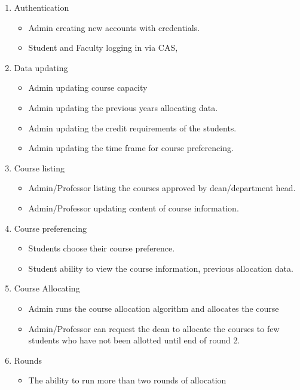 \documentclass[conference]{IEEEtran}
\begin{document}
\begin{enumerate}
    \item Authentication
        \begin{itemize}
        \item Admin creating new accounts with credentials.
        \item Student and Faculty logging in via CAS,
        \end{itemize}
    \item Data updating
        \begin{itemize}
        \item Admin updating course capacity
        \item Admin updating the previous years allocating data.
        \item Admin updating the credit requirements of the students. 
        \item Admin updating the time frame for course preferencing.
        \end{itemize}
    \item Course listing
        \begin{itemize}
        \item Admin/Professor listing the courses approved by dean/department head.
        \item Admin/Professor updating content of course information. 
        \end{itemize}
    \item Course preferencing 
        \begin{itemize}
        \item Students choose their course preference.
        \item Student ability to view the course information, previous allocation data.
        \end{itemize}
    \item Course Allocating 
        \begin{itemize}
        \item Admin runs the course allocation algorithm and allocates the course
        \item Admin/Professor can request the dean to allocate the courses to few students who have not been allotted until end of round 2.
        \end{itemize}
    \item Rounds
        \begin{itemize}
        \item The ability to run more than two rounds of allocation
        \end{itemize}
\end{enumerate}
\end{document}
